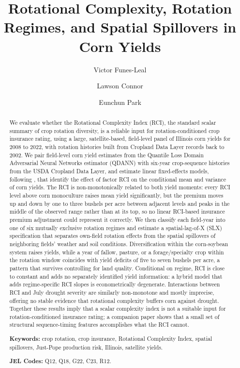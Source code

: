 \documentclass[12pt,letterpaper]{article}
\title{Rotational Complexity, Rotation Regimes, and Spatial Spillovers in Corn Yields}
\author[1]{Victor Funes-Leal}
\author[2]{Lawson Connor}
\author[3]{Eunchun Park}
\affil[1,2,3]{Department of Agricultural Economics and Agribusiness, University of Arkansas}
\date{}
\theoremstyle{remark}
\theoremstyle{remark}
\theoremstyle{plain}
\theoremstyle{definition}
\begin{document}
\maketitle
\begin{abstract}
\noindent
We evaluate whether the Rotational Complexity Index (RCI), the standard scalar summary of crop rotation diversity, is a reliable input for rotation-conditioned crop insurance rating, using a large, satellite-based, field-level panel of Illinois corn yields for 2008 to 2022, with rotation histories built from Cropland Data Layer records back to 2002. We pair field-level corn yield estimates from the Quantile Loss Domain Adversarial Neural Networks estimator (QDANN) with six-year crop-sequence histories from the USDA Cropland Data Layer, and estimate linear fixed-effects models, following \citet{Just1979}, that identify the effect of factor RCI on the conditional mean and variance of corn yields. The RCI is non-monotonically related to both yield moments: every RCI level above corn monoculture raises mean yield significantly, but the premium moves up and down by one to three bushels per acre between adjacent levels and peaks in the middle of the observed range rather than at its top, so no linear RCI-based insurance premium adjustment could represent it correctly. We then classify each field-year into one of six mutually exclusive rotation regimes and estimate a spatial-lag-of-X (SLX) specification that separates own-field rotation effects from the spatial spillovers of neighboring fields' weather and soil conditions. Diversification within the corn-soybean system raises yields, while a year of fallow, pasture, or a forage/specialty crop within the rotation window coincides with yield deficits of five to seven bushels per acre, a pattern that survives controlling for land quality. Conditional on regime, RCI is close to constant and adds no separately identified yield information: a hybrid model that adds regime-specific RCI slopes is econometrically degenerate. Interactions between RCI and July drought severity are similarly non-monotone and mostly imprecise, offering no stable evidence that rotational complexity buffers corn against drought. Together these results imply that a scalar complexity index is not a suitable input for rotation-conditioned insurance rating; a companion paper shows that a small set of structural sequence-timing features accomplishes what the RCI cannot.

\medskip\noindent
\textbf{Keywords:} crop rotation, crop insurance, Rotational Complexity Index, spatial spillovers, Just-Pope production risk, Illinois, satellite yields.

\medskip\noindent
\textbf{JEL Codes:} Q12, Q18, G22, C23, R12.
\end{abstract}
\end{document}
